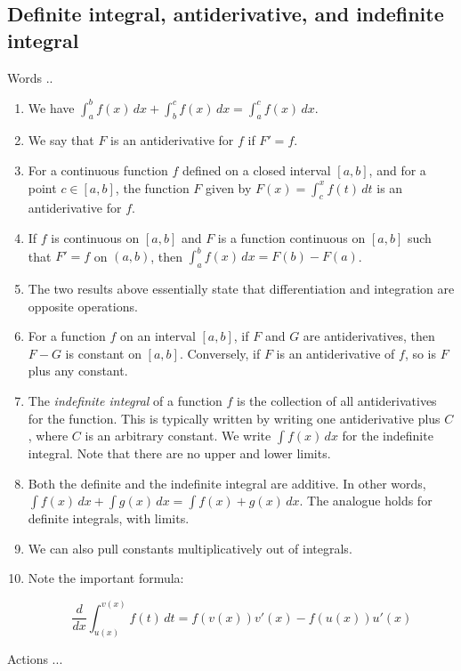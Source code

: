 \documentclass[10pt]{amsart}
\begin{document}
\subsection{Definite integral, antiderivative, and indefinite integral}

Words ..

\begin{enumerate}
\item We have $\int_a^b f(x) \, dx + \int_b^c f(x) \, dx = \int_a^c
  f(x) \, dx$.
\item We say that $F$ is an antiderivative for $f$ if $F' = f$.
\item For a continuous function $f$ defined on a closed interval
  $[a,b]$, and for a point $c \in [a,b]$, the function $F$ given by
  $F(x) = \int_c^x f(t) \, dt$ is an antiderivative for $f$.
\item If $f$ is continuous on $[a,b]$ and $F$ is a function continuous
  on $[a,b]$ such that $F' = f$ on $(a,b)$, then $\int_a^b f(x) \, dx
  = F(b) - F(a)$.
\item The two results above essentially state that differentiation and
  integration are opposite operations.
\item For a function $f$ on an interval $[a,b]$, if $F$ and $G$ are
  antiderivatives, then $F - G$ is constant on $[a,b]$. Conversely, if
  $F$ is an antiderivative of $f$, so is $F$ plus any constant.
\item The {\em indefinite integral} of a function $f$ is the
  collection of all antiderivatives for the function. This is
  typically written by writing one antiderivative plus $C$, where $C$
  is an arbitrary constant. We write $\int f(x) \, dx$ for the
  indefinite integral. Note that there are no upper and lower limits.
\item Both the definite and the indefinite integral are additive. In
  other words, $\int f(x) \, dx + \int g(x) \, dx = \int f(x) + g(x)
  \, dx$. The analogue holds for definite integrals, with limits.
\item We can also pull constants multiplicatively out of integrals.
\item Note the important formula:

  $$\frac{d}{dx} \int_{u(x)}^{v(x)} f(t) \, dt = f(v(x))v'(x) - f(u(x))u'(x)$$
\end{enumerate}

Actions ...
\end{document}
